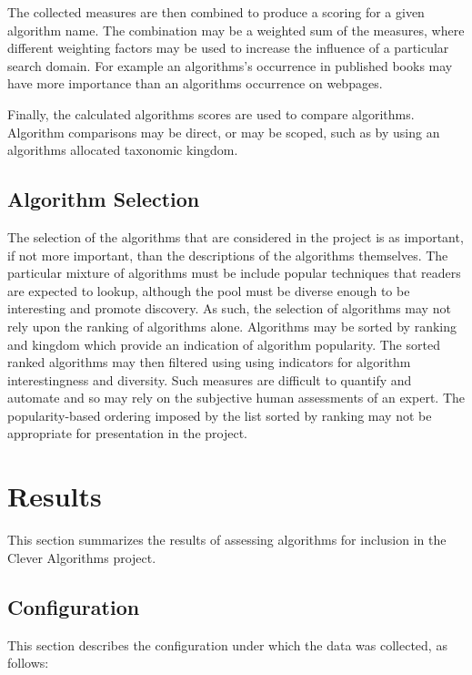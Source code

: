 \documentclass[a4paper, 11pt]{article}
\begin{document}
The collected measures are then combined to produce a scoring for a given algorithm name. The combination may be a weighted sum of the measures, where different weighting factors may be used to increase the influence of a particular search domain. For example an algorithms's occurrence in published books may have more importance than an algorithms occurrence on webpages. 

Finally, the calculated algorithms scores are used to compare algorithms. Algorithm comparisons may be direct, or may be scoped, such as by using an algorithms allocated taxonomic kingdom.

% 
% 
\subsection{Algorithm Selection}
The selection of the algorithms that are considered in the project is as important, if not more important, than the descriptions of the algorithms themselves. The particular mixture of algorithms must be include popular techniques that readers are expected to lookup, although the pool must be diverse enough to be interesting and promote discovery. As such, the selection of algorithms may not rely upon the ranking of algorithms alone. Algorithms may be sorted by ranking and kingdom which provide an indication of algorithm popularity. The sorted ranked algorithms may then filtered using using indicators for algorithm interestingness and diversity. Such measures are difficult to quantify and automate and so may rely on the subjective human assessments of an expert. The popularity-based ordering imposed by the list sorted by ranking may not be appropriate for presentation in the project. 

% 
% 
\section{Results}
\label{sec:results}
This section summarizes the results of assessing algorithms for inclusion in the Clever Algorithms project.

% 
% 
\subsection{Configuration}
This section describes the configuration under which the data was collected, as follows: 
\end{document}
